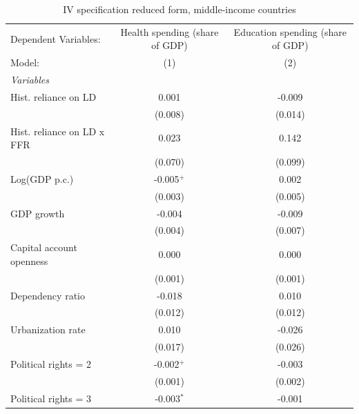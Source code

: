 
\begin{table}[htbp]
   \caption{\label{tab:IV_reduced_form_other} IV specification reduced form, middle-income countries}
   \centering
   \begin{tabular}{lcc}
      \tabularnewline \midrule \midrule
      Dependent Variables:       & Health spending (share of GDP) & Education spending (share of GDP)\\  
      Model:                     & (1)                            & (2)\\  
      \midrule
      \emph{Variables}\\
      Hist. reliance on LD       & 0.001                          & -0.009\\   
                                 & (0.008)                        & (0.014)\\   
      Hist. reliance on LD x FFR & 0.023                          & 0.142\\   
                                 & (0.070)                        & (0.099)\\   
      Log(GDP p.c.)              & -0.005$^{+}$                   & 0.002\\   
                                 & (0.003)                        & (0.005)\\   
      GDP growth                 & -0.004                         & -0.009\\   
                                 & (0.004)                        & (0.007)\\   
      Capital account openness   & 0.000                          & 0.000\\   
                                 & (0.001)                        & (0.001)\\   
      Dependency ratio           & -0.018                         & 0.010\\   
                                 & (0.012)                        & (0.012)\\   
      Urbanization rate          & 0.010                          & -0.026\\   
                                 & (0.017)                        & (0.026)\\   
      Political rights = 2       & -0.002$^{+}$                   & -0.003\\   
                                 & (0.001)                        & (0.002)\\   
      Political rights = 3       & -0.003$^{*}$                   & -0.001\\   

\end{tabular}
\end{table}
